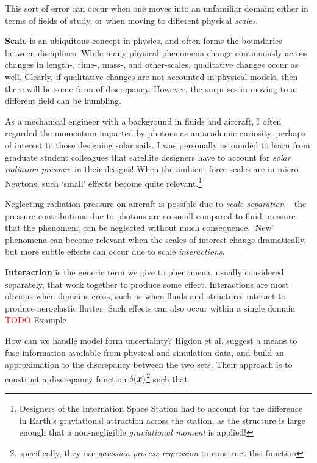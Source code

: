 \documentclass[../primer.tex]{subfiles}
\begin{document}
This sort of error can occur when one moves into an unfamiliar domain; either in
terms of fields of study, or when moving to different physical \emph{scales}.

\textbf{Scale} is an ubiquitous concept in physics, and often forms the
boundaries between disciplines. While many physical phenomena change
continuously across changes in length-, time-, mass-, and other-scales,
qualitative changes occur as well. Clearly, if qualitative changes are not
accounted in physical models, then there will be some form of discrepancy.
However, the surprises in moving to a different field can be humbling.

As a mechanical engineer with a background in fluids and aircraft, I often
regarded the momentum imparted by photons as an academic curiosity, perhaps of
interest to those designing solar sails. I was personally astounded to learn
from graduate student colleagues that satellite designers have to account for
\emph{solar radiation pressure} in their designs! When the ambient force-scales
are in micro-Newtons, such `small' effects become quite
relevant.\footnote{Designers of the Internation Space Station had to account for
  the difference in Earth's graviational attraction across the station, as the
  structure is large enough that a non-negligible \emph{graviational moment} is
  applied!}

Neglecting radiation pressure on aircraft is possible due to \emph{scale
  separation} -- the pressure contributions due to photons are so small compared
to fluid pressure that the phenomena can be neglected without much consequence.
`New' phenomena can become relevant when the scales of interest change
dramatically, but more subtle effects can occur due to scale
\emph{interactions}.

\textbf{Interaction} is the generic term we give to phenomena, usually
considered separately, that work together to produce some effect. Interactions
are most obvious when domains cross, such as when fluids and structures interact
to produce aeroelastic flutter. Such effects can also occur within a single
domain \textcolor{red}{TODO} Example

How can we handle model form uncertainty? Higdon et
al.\cite{higdon2004calibration-prediction} suggest a means to fuse information
available from physical and simulation data, and build an approximation to the
discrepancy between the two sets. Their approach is to construct a discrepancy
function $\delta(\boldsymbol{x})$\footnote{specifically, they use \emph{gaussian process
    regression} to construct thsi function} such that
\end{document}
